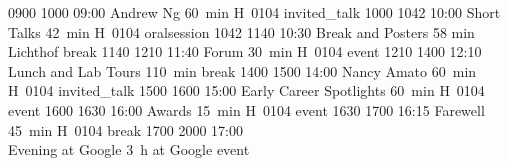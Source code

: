 \begin{timetable}
   {0900} {1000} {09:00 Andrew Ng}                            {60~min}                           {H~0104}                      {invited_talk}
   {1000} {1042} {10:00 Short Talks}                          {\vspace{1.5mm}42~min}             {\vspace{1.5mm}H~0104}        {oralsession}
   {1042} {1140} {10:30 Break and Posters}                    {\vspace{1.5mm}58 min}             {\vspace{1.5mm}Lichthof}      {break}
   {1140} {1210} {11:40 Forum}                                {\vspace{1.5mm}30~min}             {\vspace{1.5mm}H~0104}                      {event}
   {1210} {1400} {12:10\\[0.2em]Lunch and Lab Tours}          {110~min}                          {}                            {break}
   {1400} {1500} {14:00 Nancy Amato}                          {60~min}                           {H~0104}                      {invited_talk}
   {1500} {1600} {15:00 Early Career Spotlights} 	      {\vspace{1.5mm}60~min}             {\vspace{1.5mm}H~0104}        {event}
   {1600} {1630} {16:00 Awards} 	              {\vspace{1.5mm}15~min}             {\vspace{1.5mm}H~0104}        {event}
   {1630} {1700} {16:15 Farewell} 	              {\vspace{1.5mm}45~min}             {\vspace{1.5mm}H~0104}        {break}
   {1700} {2000} {17:00\\\vspace{0.3em}Evening at Google}     {3~h}                              {at Google}     {event}
\end{timetable}






\begingroup %
\sffamily



